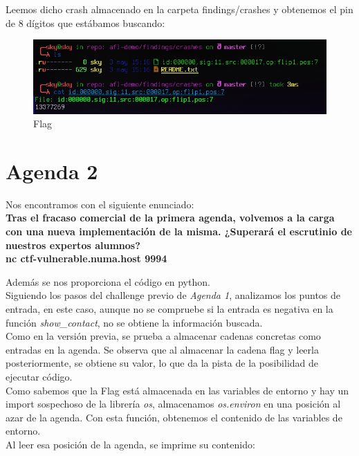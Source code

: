 \documentclass[12pt, a4paper,twoside,titlepage]{article}
\begin{document}
Leemos dicho crash almacenado en la carpeta findings/crashes y obtenemos el pin de 8 dígitos que estábamos buscando:

\begin{figure}[H]
    \centering
    \includegraphics[width=140mm]{Figuras/Caja Negra/Crash.png}
    \caption{Flag}
    \label{fig:my_label}
\end{figure}


\newpage

\section{Agenda 2}

Nos encontramos con el siguiente enunciado:\\

\textbf{Tras el fracaso comercial de la primera agenda, volvemos a la carga con una nueva implementación de la misma. ¿Superará el escrutinio de nuestros expertos alumnos?
\\
nc ctf-vulnerable.numa.host 9994}

Además se nos proporciona el código en python.\\

Siguiendo los pasos del challenge previo de \emph{Agenda 1}, analizamos los puntos de entrada, en este caso, aunque no se compruebe si la entrada es negativa en la función \emph{show\_contact}, no se obtiene la información buscada.\\

Como en la versión previa, se prueba a almacenar cadenas concretas como entradas en la agenda. Se observa que al almacenar la cadena flag y leerla posteriormente, se obtiene su valor, lo que da la pista de la posibilidad de ejecutar código.\\

Como sabemos que la Flag está almacenada en las variables de entorno y hay un import sospechoso de la librería \emph{os}, almacenamos \emph{os.environ} en una posición al azar de la agenda. Con esta función, obtenemos el contenido de las variables de entorno.\\
Al leer esa posición de la agenda, se imprime su contenido:
\end{document}
